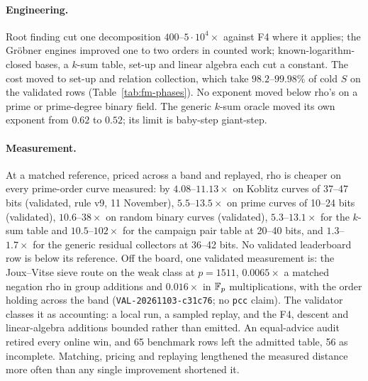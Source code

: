 \paragraph{Engineering.} Root finding cut one decomposition
$400$--$5\cdot10^4\times$ against F4 where it applies; the Gr\"obner
engines improved one to two orders in counted work; known-logarithm-closed
bases, a $k$-sum table, set-up and linear algebra each cut a constant. The
cost moved to set-up and relation collection, which take
$98.2$--$99.98\%$ of cold $S$ on the validated rows
(Table~\ref{tab:fm-phases}). No exponent moved below rho's on a prime or
prime-degree binary field. The generic $k$-sum oracle moved its own
exponent from $0.62$ to $0.52$; its limit is baby-step giant-step.

\paragraph{Measurement.} At a matched reference, priced across a band and
replayed, rho is cheaper on every prime-order curve measured: by
$4.08$--$11.13\times$ on Koblitz curves of 37--47 bits (validated, rule v9,
11 November), $5.5$--$13.5\times$
on prime curves of 10--24 bits (validated), $10.6$--$38\times$ on random
binary curves (validated), $5.3$--$13.1\times$ for the $k$-sum table and
$10.5$--$102\times$ for the campaign pair table at 20--40 bits, and
$1.3$--$1.7\times$ for the generic residual collectors at 36--42 bits. No
validated leaderboard row is below its reference. Off the board, one
validated measurement is: the Joux--Vitse sieve route on the weak class at
$p=1511$, $0.0065\times$ a matched negation rho in group additions and
$0.016\times$ in $\mathbb{F}_p$ multiplications, with the order holding across
the band (\texttt{VAL-20261103-c31c76}; no \texttt{pcc} claim). The
validator classes it as accounting: a local run, a sampled replay, and the
F4, descent and linear-algebra additions bounded rather than emitted. An
equal-advice audit retired every online win, and 65 benchmark rows left
the admitted table, 56 as incomplete. Matching, pricing and replaying
lengthened the measured distance more often than any single improvement
shortened it.

